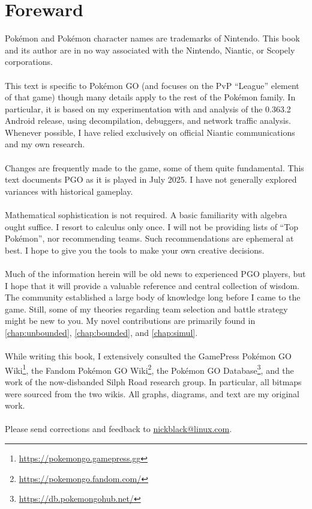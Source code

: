 \clearpage
\chapter{Foreward}

\noindent{}Pokémon and Pokémon character names are trademarks of Nintendo.
This book and its author are in no way associated with the Nintendo, Niantic,
  or Scopely corporations.\\
\\
\noindent{}This text is specific to Pokémon GO (and focuses on the PvP
  ``League'' element of that game) though many details
  apply to the rest of the Pokémon family.
In particular, it is based on my experimentation with and analysis of
 the 0.363.2 Android release, using decompilation, debuggers, and
 network traffic analysis.
Whenever possible, I have relied exclusively on official Niantic communications
 and my own research.\\
\\
\noindent{}Changes are frequently made to the game, some of them quite fundamental.
This text documents PGO as it is played in July 2025.
I have not generally explored variances with historical gameplay.\\
\\
\noindent{}Mathematical sophistication is not required.
A basic familiarity with algebra ought suffice.
I resort to calculus only once.
I will not be providing lists of ``Top Pokémon'', nor recommending teams.
Such recommendations are ephemeral at best.
I hope to give you the tools to make your own creative decisions.\\
\\
\noindent{}Much of the information herein will be old news to experienced
 PGO players, but I hope that it will provide a valuable reference and central collection of wisdom.
The community established a large body of knowledge long before I
 came to the game.
Still, some of my theories regarding team selection and battle strategy might
  be new to you.
My novel contributions are primarily found in \autoref{chap:unbounded},
  \autoref{chap:bounded}, and \autoref{chap:simul}.\\
\\
\noindent{}While writing this book, I extensively consulted the
  GamePress Pokémon GO Wiki\footnote{\url{https://pokemongo.gamepress.gg}},
  the Fandom Pokémon GO Wiki\footnote{\url{https://pokemongo.fandom.com/}},
  the Pokémon GO Database\footnote{\url{https://db.pokemongohub.net/}},
  and the work of the now-disbanded Silph Road research group.
In particular, all bitmaps were sourced from the two wikis.
All graphs, diagrams, and text are my original work.\\
\\
\noindent{}Please send corrections and feedback to 
  \href{mailto:nickblack@linux.com}{nickblack@linux.com}.
\mainmatter
